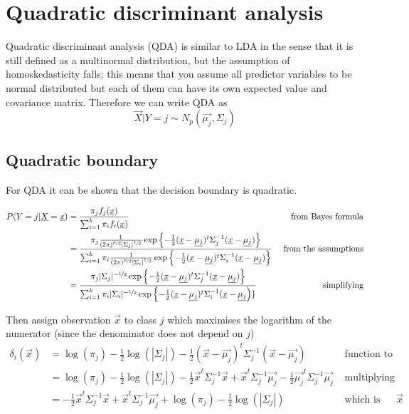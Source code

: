   \section{Quadratic discriminant analysis}
    Quadratic discriminant analysis (QDA) is similar to LDA in the sense that it is still defined as a multinormal distribution, but the assumption of homoskedasticity falls; this means that you assume all predictor variables to be normal distributed but each of them can have its own expected value and covariance matrix. Therefore we can write QDA as
    $$\vec{X}|Y=j \sim N_p(\vec{\mu_j}, \Sigma_j)$$

    \subsection{Quadratic boundary}
      For QDA it can be shown that the decision boundary is quadratic.

      \begin{align*}
      P(Y=j|\vec{X} = \vec{x})
      & = \frac{\pi_jf_j(\vec{x})}{\sum_{i=1}^{k}\pi_if_i(\vec{x})} 
      & \text{ from Bayes formula} \\
      & = \frac
      {\pi_j\frac{1}{(2\pi)^{\nicefrac{p}{2}}|\Sigma_j|^{\nicefrac{1}{2}}}\exp\left\{-\frac{1}{2}(\vec{x}-\vec{\mu_j})^t \Sigma^{-1}_j (\vec{x}-\vec{\mu_j})\right\}}
      {\sum_{i=1}^{k}\pi_i\frac{1}{(2\pi)^{\nicefrac{p}{2}}|\Sigma_i|^{\nicefrac{1}{2}}}\exp\left\{-\frac{1}{2}(\vec{x}-\vec{\mu_j})^t \Sigma^{-1}_i (\vec{x}-\vec{\mu_j})\right\}}
      & \text{ from the assumptions} \\
      & = \frac
      {\pi_j|\Sigma_j|^{-\nicefrac{1}{2}}\exp\left\{-\frac{1}{2}(\vec{x}-\vec{\mu_j})^t \Sigma^{-1}_j (\vec{x}-\vec{\mu_j})\right\}}
      {\sum_{i=1}^{k}\pi_i|\Sigma_i|^{-\nicefrac{1}{2}}\exp\left\{-\frac{1}{2}(\vec{x}-\vec{\mu_j})^t \Sigma^{-1}_i (\vec{x}-\vec{\mu_j}\right)\}}
      & \text{ simplifying}
      \end{align*}

      Then assign observation $\vec{x}$ to class $j$ which maximises the logarithm of the numerator (since the denominator does not depend on $j$)
      \begin{align*}
      \delta_i(\vec{x}) 
      & = \log(\pi_j) -\frac{1}{2}\log(|\Sigma_j|) -\frac{1}{2}(\vec{x}-\vec{\mu_j})^t \Sigma^{-1}_j (\vec{x}-\vec{\mu_j}) 
      & \text{ function to maximise}\\
      & = \log(\pi_j) -\frac{1}{2}\log(|\Sigma_j|) -\frac{1}{2}\vec{x}^t\Sigma^{-1}_j\vec{x} + \vec{x}^t \Sigma^{-1}_j\vec{\mu_j} - \frac{1}{2}\vec{\mu_j}^t\Sigma^{-1}_j\vec{\mu_j}
      & \text{ multiplying}\\
      & =-\frac{1}{2}\vec{x}^t\Sigma^{-1}_j\vec{x} + \vec{x}^t \Sigma^{-1}_j\vec{\mu_j} + \log(\pi_j) -\frac{1}{2}\log(|\Sigma_j|) 
      & \text{ which is quadratic in } \vec{x}\\
      \end{align*}

